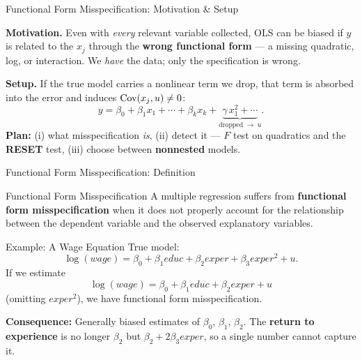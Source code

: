 \documentclass[aspectratio=169, 12pt]{beamer}
\begin{document}
\begin{frame}{Functional Form Misspecification: Motivation \& Setup}

  \begin{highlightbox}
    \textbf{Motivation.} Even with \emph{every} relevant variable collected, OLS can
    be biased if $y$ is related to the $x_j$ through the \textbf{wrong functional
    form} --- a missing quadratic, log, or interaction. We \emph{have} the data; only
    the specification is wrong.
  \end{highlightbox}

  \begin{keybox}
    \textbf{Setup.} If the true model carries a nonlinear term we drop, that term is
    absorbed into the error and induces $\operatorname{Cov}(x_j, u) \neq 0$:
    \[
      y = \beta_0 + \beta_1 x_1 + \cdots + \beta_k x_k
        + \underbrace{\gamma\, x_1^2 + \cdots}_{\text{dropped}\;\to\; u} .
    \]
    \textbf{Plan:} (i) what misspecification \emph{is}, (ii) detect it --- $F$ test on
    quadratics and the \textbf{RESET} test, (iii) choose between \textbf{nonnested}
    models.
  \end{keybox}

\end{frame}

\begin{frame}[shrink=30]{Functional Form Misspecification: Definition}

  \begin{definitionbox}{Functional Form Misspecification}
    A multiple regression suffers from \textbf{functional form misspecification}
    when it does not properly account for the relationship between the dependent
    variable and the observed explanatory variables.
  \end{definitionbox}

  \begin{examplebox}{Example: A Wage Equation}
    True model:
    \[
      \log(\mathit{wage}) = \beta_0 + \beta_1 \mathit{educ} + \beta_2 \mathit{exper} + \beta_3 \mathit{exper}^2 + u.
    \]
    If we estimate
    \[
      \log(\mathit{wage}) = \beta_0 + \beta_1 \mathit{educ} + \beta_2 \mathit{exper} + u
    \]
    (omitting $exper^2$), we have functional form misspecification.
  \end{examplebox}

  \textbf{Consequence:} Generally biased estimates of $\beta_0$, $\beta_1$, $\beta_2$.
  The \textbf{return to experience} is no longer $\beta_2$ but $\beta_2 + 2\beta_3 \mathit{exper}$,
  so a single number cannot capture it.

\end{frame}
\end{document}
